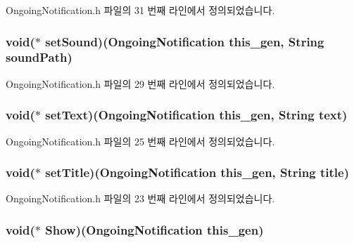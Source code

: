 Ongoing\-Notification.\-h 파일의 31 번째 라인에서 정의되었습니다.

\hypertarget{struct___ongoing_notification_aa822ce12ab238447d07f6821629dfaaf}{
\subsubsection[{set\-Sound}]{\setlength{\rightskip}{0pt plus 5cm}void($\ast$  set\-Sound)({\bf Ongoing\-Notification} this\-\_\-gen, {\bf String} sound\-Path)}}\label{struct___ongoing_notification_aa822ce12ab238447d07f6821629dfaaf}


Ongoing\-Notification.\-h 파일의 29 번째 라인에서 정의되었습니다.

\hypertarget{struct___ongoing_notification_a00acfb78dfd3520407a0da33290f67b6}{
\subsubsection[{set\-Text}]{\setlength{\rightskip}{0pt plus 5cm}void($\ast$  set\-Text)({\bf Ongoing\-Notification} this\-\_\-gen, {\bf String} text)}}\label{struct___ongoing_notification_a00acfb78dfd3520407a0da33290f67b6}


Ongoing\-Notification.\-h 파일의 25 번째 라인에서 정의되었습니다.

\hypertarget{struct___ongoing_notification_a1603dddb1e9306dd04f416ec71e353b7}{
\subsubsection[{set\-Title}]{\setlength{\rightskip}{0pt plus 5cm}void($\ast$  set\-Title)({\bf Ongoing\-Notification} this\-\_\-gen, {\bf String} title)}}\label{struct___ongoing_notification_a1603dddb1e9306dd04f416ec71e353b7}


Ongoing\-Notification.\-h 파일의 23 번째 라인에서 정의되었습니다.

\hypertarget{struct___ongoing_notification_af3f0ea7c9764813a55482dae3bcf5037}{
\subsubsection[{Show}]{\setlength{\rightskip}{0pt plus 5cm}void($\ast$  Show)({\bf Ongoing\-Notification} this\-\_\-gen)}}\label{struct___ongoing_notification_af3f0ea7c9764813a55482dae3bcf5037}


